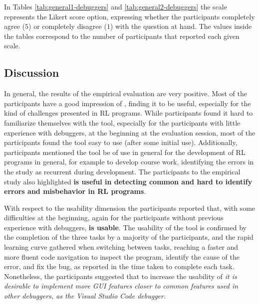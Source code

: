 % 

In Tables \ref{tab:general1-debuggers} and \ref{tab:general2-debuggers} the scale represents the 
Likert score option, expressing whether the participants completely agree ($5$) or completely disagree 
($1$) with the question at hand. The values inside the tables correspond to the number of participants 
that reported each given scale.

\subsection{Discussion}
\label{sec:discussion}

In general, the results of the empirical evaluation are very positive. Most of the participants have a 
good impression of \flik, finding it to be useful, especially for the kind of challenges presented in 
\ac{RL} programs. While participants found it hard to familiarize themselves with the tool, especially 
for the participants with little experience with debuggers, at the beginning at the evaluation session, 
most of the participants found the tool easy to use (after some initial use). Additionally, participants 
mentioned the tool be of use in general for the development of \ac{RL} programs in general, for example 
to develop course work, identifying the errors in the study as recurrent during development. The 
participants to the empirical study  also highlighted \textbf{\flik is useful in detecting common and hard to identify errors and misbehavior in \ac{RL} programs}.

With respect to the usability dimension the participants reported that, with some difficulties at the 
beginning, again for the participants without previous experience with debuggers, 
\textbf{\flik is usable}. The usability of the tool is confirmed by the completion of the three tasks by a 
majority of the participants, and the rapid learning curve gathered when switching between tasks, 
reaching a faster and more fluent code navigation to inspect the program, identify the cause of the 
error, and fix the bug, as reported in the time taken to complete each task. Nonetheless, the 
participants suggested that to increase the usability of \flik \textit{it is desirable to implement more GUI 
features closer to common features used in other debuggers, as the Visual Studio Code debugger}.


\endinput

